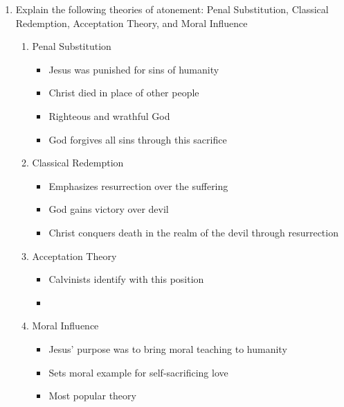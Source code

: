 \documentclass[8pt]{article}
\begin{document}
\begin{enumerate}
    \item Explain the following theories of atonement: Penal Substitution, Classical Redemption, Acceptation Theory, and Moral Influence
    \begin{enumerate}
        \item Penal Substitution
        \begin{itemize}
            \item Jesus was punished for sins of humanity
            \item Christ died in place of other people
            \item Righteous and wrathful God
            \item God forgives all sins through this sacrifice
        \end{itemize}
        \item Classical Redemption
        \begin{itemize}
            \item Emphasizes resurrection over the suffering
            \item God gains victory over devil
            \item Christ conquers death in the realm of the devil through resurrection
        \end{itemize}
        \item Acceptation Theory
        \begin{itemize}
            \item Calvinists identify with this position
            \item
        \end{itemize}
        \item Moral Influence
        \begin{itemize}
            \item Jesus' purpose was to bring moral teaching to humanity
            \item Sets moral example for self-sacrificing love
            \item Most popular theory
        \end{itemize}
    \end{enumerate}


\end{enumerate}
\end{document}
